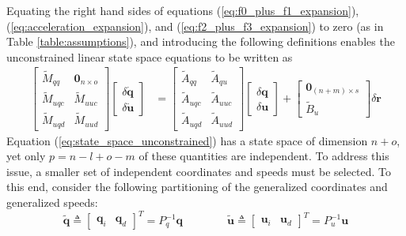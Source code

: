 \documentclass[smallcondensed]{svjour3}                     %
\begin{document}
Equating the right hand sides of equations (\ref{eq:f0_plus_f1_expansion}),
(\ref{eq:acceleration_expansion}),
and (\ref{eq:f2_plus_f3_expansion}) to zero (as in Table
\ref{table:assumptions}), and introducing the following definitions
enables the unconstrained linear state space equations to be written as
\begin{align}
  \label{eq:state_space_unconstrained}
  \left[
    \begin{array}{cc}
      \tilde{M}_{qq} & \bm{0}_{n \times o} \\
      \tilde{M}_{uqc} & \tilde{M}_{uuc} \\
      \tilde{M}_{uqd} & \tilde{M}_{uud}
    \end{array}
    \right]
    \left[
      \begin{array}{c}
        \delta \bm{\dot{q}} \\
        \delta \bm{\dot{u}}
      \end{array}
    \right]
   &=
   \left[
     \begin{array}{cc}
       \tilde{A}_{qq} & \tilde{A}_{qu} \\
       \tilde{A}_{uqc} & \tilde{A}_{uuc} \\
       \tilde{A}_{uqd} & \tilde{A}_{uud}
     \end{array}
   \right]
    \left[
      \begin{array}{c}
        \delta \bm{q} \\
        \delta \bm{u}
      \end{array}
    \right]
    +
    \left[
      \begin{array}{c}
        \bm{0}_{(n + m) \times s} \\
        \tilde{B}_{u}
      \end{array}
    \right]
    \delta \bm{r}
\end{align}
Equation (\ref{eq:state_space_unconstrained}) has a state space of dimension $n
+ o$, yet only $p = n - l + o - m$ of these quantities are independent.  To
address this issue, a smaller set of independent coordinates and speeds must be
selected. To this end, consider the following partitioning of the generalized
coordinates and generalized speeds:
\begin{equation*}
  \tilde{\bm{q}} \triangleq \left[\begin{array}{cc}\bm{q}_{i} &
      \bm{q}_{d}\end{array}\right]^{T} =  P_{q}^{-1} \bm{q}
      \qquad\qquad
  \tilde{\bm{u}} \triangleq \left[\begin{array}{cc}\bm{u}_{i} &
      \bm{u}_{d}\end{array}\right]^{T} =  P_{u}^{-1} \bm{u}
\end{equation*}
\end{document}
